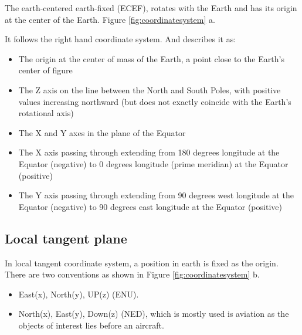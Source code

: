 The earth-centered earth-fixed (ECEF), rotates with the Earth and has its origin at the center of the Earth. Figure \ref{fig:coordinatesystem} a.

It follows the right hand coordinate system. And  describes it as:

\begin{itemize}
	\item The origin at the center of mass of the Earth, a point close to the Earth's center of figure
	\item The Z axis on the line between the North and South Poles, with positive values increasing northward (but does not exactly coincide with the Earth's rotational axis)
	\item The X and Y axes in the plane of the Equator
	\item The X axis passing through extending from 180 degrees longitude at the Equator (negative) to 0 degrees longitude (prime meridian) at the Equator (positive)
	\item The Y axis passing through extending from 90 degrees west longitude at the Equator (negative) to 90 degrees east longitude at the Equator (positive)
\end{itemize}

\subsection{Local tangent plane}

In local tangent coordinate system, a position in earth is fixed as the origin. There are two conventions as shown in Figure \ref{fig:coordinatesystem} b.

\begin{itemize}
	\item East(x), North(y), UP(z) (ENU).
	\item North(x), East(y), Down(z) (NED), which is mostly used is aviation as the objects of interest lies before an aircraft.
\end{itemize}


